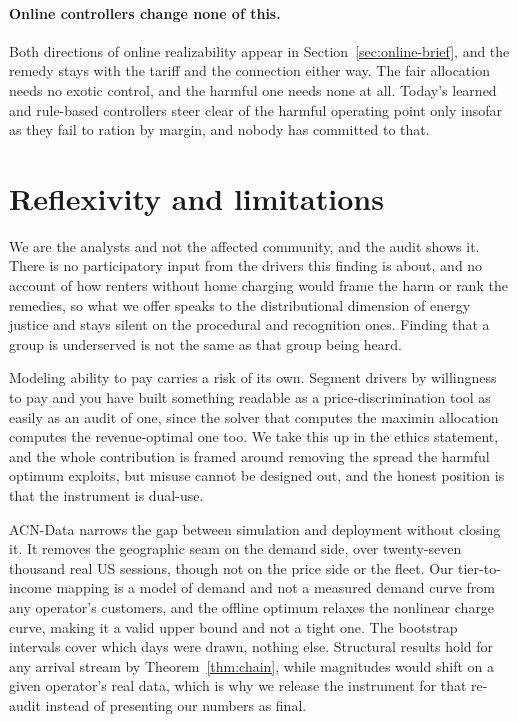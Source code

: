 \documentclass[manuscript, screen, review, anonymous]{acmart}
\begin{document}
\paragraph{Online controllers change none of this.}
Both directions of online realizability appear in Section~\ref{sec:online-brief}, and the remedy stays with the tariff and the connection either way. The fair allocation needs no exotic control, and the harmful one needs none at all. Today's learned and rule-based controllers steer clear of the harmful operating point only insofar as they fail to ration by margin, and nobody has committed to that.

\section{Reflexivity and limitations}
\label{sec:reflexivity}

We are the analysts and not the affected community, and the audit shows it. There is no participatory input from the drivers this finding is about, and no account of how renters without home charging would frame the harm or rank the remedies, so what we offer speaks to the distributional dimension of energy justice and stays silent on the procedural and recognition ones. Finding that a group is underserved is not the same as that group being heard.

Modeling ability to pay carries a risk of its own. Segment drivers by willingness to pay and you have built something readable as a price-discrimination tool as easily as an audit of one, since the solver that computes the maximin allocation computes the revenue-optimal one too. We take this up in the ethics statement, and the whole contribution is framed around removing the spread the harmful optimum exploits, but misuse cannot be designed out, and the honest position is that the instrument is dual-use.

ACN-Data narrows the gap between simulation and deployment without closing it. It removes the geographic seam on the demand side, over twenty-seven thousand real US sessions, though not on the price side or the fleet. Our tier-to-income mapping is a model of demand and not a measured demand curve from any operator's customers, and the offline optimum relaxes the nonlinear charge curve, making it a valid upper bound and not a tight one. The bootstrap intervals cover which days were drawn, nothing else. Structural results hold for any arrival stream by Theorem~\ref{thm:chain}, while magnitudes would shift on a given operator's real data, which is why we release the instrument for that re-audit instead of presenting our numbers as final.
\end{document}
